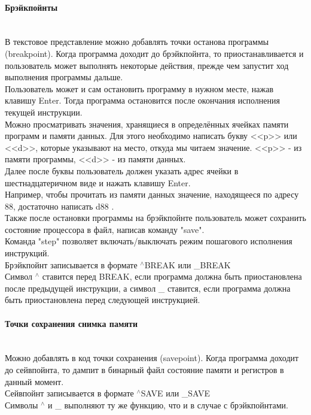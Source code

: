 \paragraph{Брэйкпойнты}~\\
В текстовое представление можно добавлять точки останова программы (breakpoint). Когда программа доходит до брэйкпойнта, то приостанавливается и пользователь может выполнять некоторые действия, прежде чем запустит ход выполнения программы дальше.\\
Пользователь может и сам остановить программу в нужном месте, нажав клавишу Enter. Тогда программа остановится после окончания исполнения текущей инструкции. \\
Можно просматривать значения, хранящиеся в определённых ячейках памяти программ и памяти данных. Для этого необходимо написать букву <<p>> или <<d>>, которые указывают на место, откуда мы читаем значение. <<p>> - из памяти программы, <<d>> - из памяти данных. \\
Далее после буквы пользователь должен указать адрес ячейки в шестнадцатеричном виде и нажать клавишу Enter. \\
Например, чтобы прочитать из памяти данных значение, находящееся по адресу 88, достаточно написать d88 . \\
Также после остановки программы на брэйкпойнте пользователь может сохранить состояние процессора в файл, написав команду "save". \\
Команда "step" позволяет включать/выключать режим пошагового исполнения инструкций. \\
Брэйкпойнт записывается в формате $^\wedge$BREAK или \_BREAK \\
Символ $^\wedge$ ставится перед BREAK, если программа должна быть приостановлена после предыдущей инструкции, а символ \_ ставится, если программа должна быть приостановлена перед следующей инструкцией.

\paragraph{Точки сохранения снимка памяти}~\\
Можно добавлять в код точки сохранения (savepoint). Когда программа доходит до сейвпойнта, то дампит в бинарный файл состояние памяти и регистров в данный момент.\\
Сейвпойнт записывается в формате $^\wedge$SAVE или \_SAVE \\
Символы $^\wedge$ и \_ выполняют ту же функцию, что и в случае с брэйкпойнтами. \\

